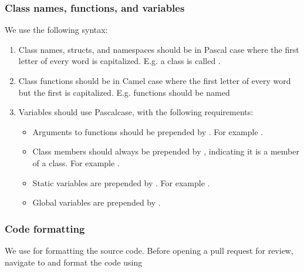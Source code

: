 \documentclass[letterpaper,10pt,english]{sphinxmanual}
\begin{document}
\subsubsection{Class names, functions, and variables}
\label{\detokenize{Contrib/CodeStandard:class-names-functions-and-variables}}
\sphinxAtStartPar
We use the following syntax:
\begin{enumerate}
%
\item {} 
\sphinxAtStartPar
Class names, structs, and namespaces should be in Pascal case where the first letter of every word is capitalized.
E.g. a class is called .

\item {} 
\sphinxAtStartPar
Class functions should be in Camel case where the first letter of every word but the first is capitalized.
E.g. functions should be named 

\item {} 
\sphinxAtStartPar
Variables should use Pascal\sphinxhyphen{}case, with the following requirements:
\begin{itemize}
\item {} 
\sphinxAtStartPar
Arguments to functions should be prepended by . For example .

\item {} 
\sphinxAtStartPar
Class members should always be prepended by , indicating it is a member of a class. For example .

\item {} 
\sphinxAtStartPar
Static variables are prepended by . For example .

\item {} 
\sphinxAtStartPar
Global variables are prepended by \sphinxcode{\sphinxupquote{//}}.

\end{itemize}

\end{enumerate}


\subsubsection{Code formatting}
\label{\detokenize{Contrib/CodeStandard:code-formatting}}
\sphinxAtStartPar
We use  for formatting the source code.
Before opening a pull request for review, navigate to  and format the code using
\end{document}
